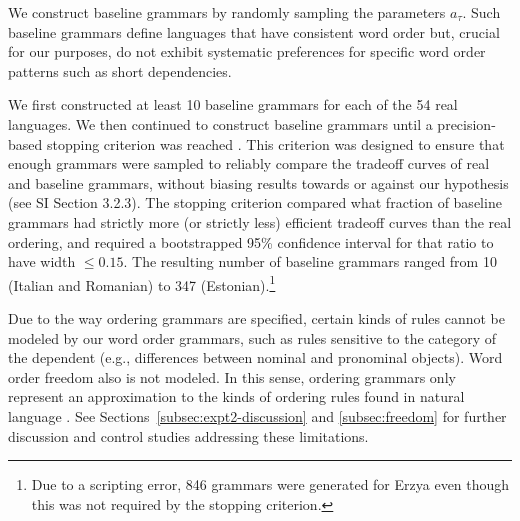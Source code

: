 We construct baseline grammars by randomly sampling the parameters $a_\tau$.
Such baseline grammars define languages that have consistent word order but, crucial for our purposes, do not exhibit systematic preferences for specific word order patterns such as short dependencies. %


We first constructed at least 10 baseline grammars for each of the 54 real languages.
We then continued to construct baseline grammars until a precision-based stopping criterion was reached \CITE. This criterion was designed to ensure that enough grammars were sampled to reliably compare the tradeoff curves of real and baseline grammars, without biasing results towards or against our hypothesis (see SI Section 3.2.3).
The stopping criterion compared what fraction of baseline grammars had strictly more (or strictly less) efficient tradeoff curves than the real ordering, and required a bootstrapped 95\% confidence interval for that ratio to have width $\leq 0.15$.
The resulting number of baseline grammars ranged from 10 (Italian and Romanian) to 347 (Estonian).\footnote{Due to a scripting error, 846 grammars were generated for Erzya even though this was not required by the stopping criterion.}

Due to the way ordering grammars are specified, certain kinds of rules cannot be modeled by our word order grammars, such as rules sensitive to the category of the dependent (e.g., differences between nominal and pronominal objects).
Word order freedom also is not modeled.
In this sense, ordering grammars only represent an approximation to the kinds of ordering rules found in natural language \citep{gildea-optimizing-2007, gildea-grammars-2010, gildea-human-2015}.
See Sections~\ref{subsec:expt2-discussion} and \ref{subsec:freedom} for further discussion and control studies addressing these limitations.



